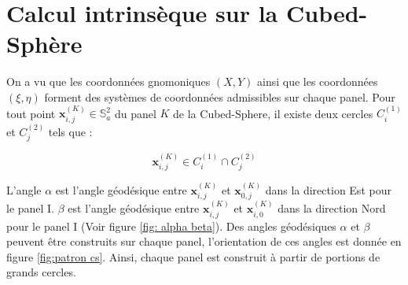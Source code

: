 \section{Calcul intrinsèque sur la Cubed-Sphère}

On a vu que les coordonnées gnomoniques $(X,Y)$ ainsi que les coordonnées $(\xi,\eta)$ forment des systèmes de coordonnées admissibles sur chaque panel.  Pour tout point $\mathbf{x}_{i,j}^{(K)} \in \mathbb{S}_a^2$ du panel $K$ de la Cubed-Sphere, il existe deux cercles $C_i^{(1)}$ et $C_j^{(2)}$ tels que :

\begin{equation}
\mathbf{x}_{i,j}^{(K)} \in C_i^{(1)} \cap C_j^{(2)}
\end{equation}

L'angle $\alpha$ est l'angle géodésique entre $\mathbf{x}_{i,j}^{(K)}$ et $\mathbf{x}_{0,j}^{(K)}$ dans la direction Est pour le panel I. $\beta$ est l'angle géodésique entre $\mathbf{x}_{i,j}^{(K)}$ et $\mathbf{x}_{i,0}^{(K)}$ dans la direction Nord pour le panel I (Voir figure \ref{fig: alpha beta}). Des angles géodésiques $\alpha$ et $\beta$ peuvent être construits sur chaque panel, l'orientation de ces angles est donnée en figure \ref{fig:patron cs}. Ainsi, chaque panel est construit à partir de portions de grands cercles.

